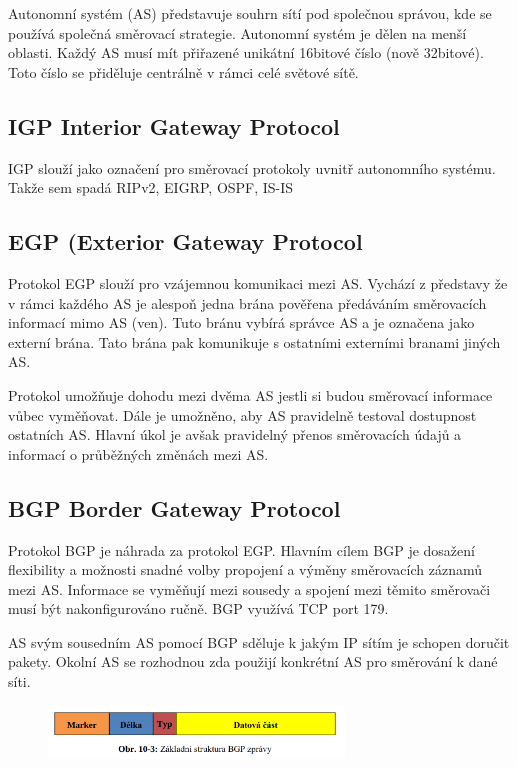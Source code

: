 Autonomní systém (AS) představuje souhrn sítí pod společnou správou, kde se používá společná směrovací strategie.
Autonomní systém je dělen na menší oblasti.
Každý AS musí mít přiřazené unikátní 16bitové číslo (nově 32bitové).
Toto číslo se přiděluje centrálně v rámci celé světové sítě.

\subsection{IGP Interior Gateway Protocol}

IGP slouží jako označení pro směrovací protokoly uvnitř autonomního systému.
Takže sem spadá RIPv2, EIGRP, OSPF, IS-IS

\subsection{EGP (Exterior Gateway Protocol}

Protokol EGP slouží pro vzájemnou komunikaci mezi AS.
Vychází z představy že v rámci každého AS je alespoň jedna brána pověřena předáváním směrovacích informací mimo AS (ven).
Tuto bránu vybírá správce AS a je označena jako externí brána.
Tato brána pak komunikuje s ostatními externími branami jiných AS.

Protokol umožňuje dohodu mezi dvěma AS jestli si budou směrovací informace vůbec vyměňovat.
Dále je umožněno, aby AS pravidelně testoval dostupnost ostatních AS.
Hlavní úkol je avšak pravidelný přenos směrovacích údajů a informací o průběžných změnách mezi AS.

\subsection{BGP Border Gateway Protocol}

Protokol BGP je náhrada za protokol EGP.
Hlavním cílem BGP je dosažení flexibility a možnosti snadné volby propojení a výměny směrovacích záznamů mezi AS.
Informace se vyměňují mezi sousedy a spojení mezi těmito směrovači musí být nakonfigurováno ručně.
BGP využívá TCP port 179.

AS svým sousedním AS pomocí BGP sděluje k jakým IP sítím je schopen doručit pakety.
Okolní AS se rozhodnou zda použijí konkrétní AS pro směrování k dané síti.

\begin{figure}[!h]
    \centering
    \includegraphics[width=0.7\textwidth]{obrazky/091.png}
\end{figure}

